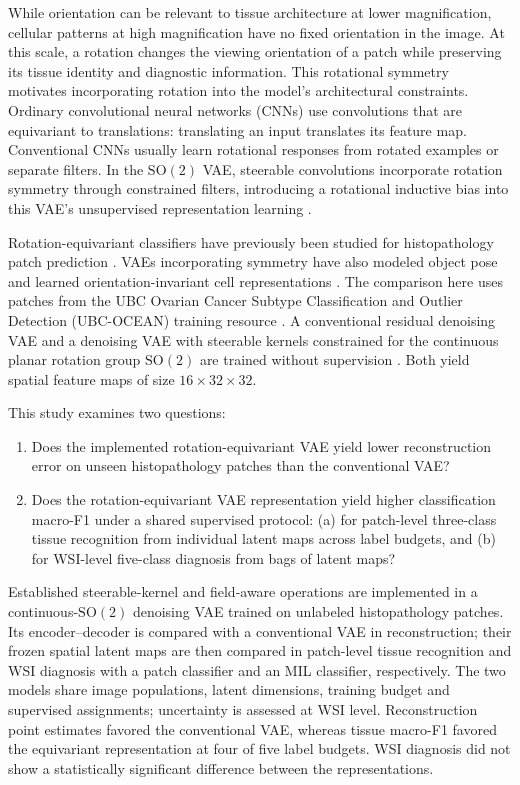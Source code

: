 \documentclass[conference,a4paper]{IEEEtran}
\newcommand{\SOtwo}{\mathrm{SO}(2)}
\begin{document}
While orientation can be relevant to tissue architecture at lower
magnification, cellular patterns at high magnification have no fixed
orientation in the image. At this scale, a rotation changes the viewing
orientation of a patch while preserving its tissue identity and diagnostic
information. This rotational symmetry motivates incorporating rotation into
the model's architectural constraints. Ordinary convolutional neural networks
(CNNs) use convolutions that are equivariant to translations: translating an
input translates its feature map. Conventional CNNs usually learn rotational
responses from rotated examples or separate filters. In the $\SOtwo$ VAE,
steerable convolutions incorporate rotation symmetry through constrained
filters, introducing a rotational inductive bias into this VAE's
unsupervised representation learning
\cite{cohen_group_2016,cohen_steerable_2017,weiler_general_2019}.

Rotation-equivariant classifiers have previously been studied for
histopathology patch prediction \cite{veeling_rotation_2018}. VAEs
incorporating symmetry have also modeled object pose and learned orientation-invariant cell
representations \cite{nasiri_target_2022,burgess_orientation_2024}.
The comparison here uses patches from the UBC Ovarian Cancer Subtype
Classification and Outlier Detection (UBC-OCEAN) training resource
\cite{ubc_ocean_2023}. A conventional residual denoising VAE and a denoising VAE with
steerable kernels constrained for the continuous planar rotation group
$\SOtwo$ are trained without supervision
\cite{kingma_auto_encoding_2014,im_denoising_2017}. Both yield spatial
feature maps of size $16\times32\times32$.

This study examines two questions:

\begin{enumerate}
    \item Does the implemented rotation-equivariant VAE yield lower
    reconstruction error on unseen histopathology patches than the
    conventional VAE?
    \item Does the rotation-equivariant VAE representation yield higher
    classification macro-F1 under a shared supervised protocol: (a) for
    patch-level three-class tissue recognition from individual latent maps
    across label budgets, and (b) for WSI-level five-class diagnosis from
    bags of latent maps?
\end{enumerate}

Established steerable-kernel and field-aware operations are
implemented in a continuous-$\SOtwo$ denoising VAE trained on unlabeled
histopathology patches. Its encoder--decoder is compared with a conventional
VAE in reconstruction; their frozen spatial latent maps are then compared in
patch-level tissue recognition and WSI diagnosis with a patch classifier and
an MIL classifier, respectively. The two models share image populations,
latent dimensions, training budget and supervised assignments; uncertainty is
assessed at WSI level. Reconstruction point estimates favored the conventional
VAE, whereas tissue macro-F1 favored the equivariant representation at four of
five label budgets. WSI diagnosis did not show a statistically significant
difference between the representations.
\end{document}
